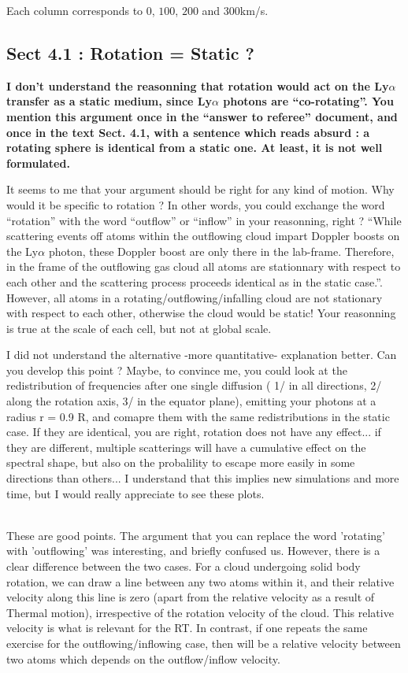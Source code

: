 \documentclass[12pt]{article}
\begin{document}
Each column corresponds to $0$, $100$, $200$ and $300$km/s.


\subsection*{Sect 4.1 : Rotation = Static ?}

{\bf I don’t understand the reasonning that rotation would act on the
  Ly$\alpha$ transfer as a static medium, since Ly$\alpha$ photons are
  “co-rotating”. You mention this argument once in the “answer to
  referee” document, and once in the text Sect. 4.1, with a sentence
  which reads absurd : a rotating sphere is identical from a static
  one. At least, it is not well formulated.

It seems to me that your argument should be right for any kind of
motion. Why would it be specific to rotation ? In other words, you
could exchange the word “rotation” with the word “outflow” or “inflow”
in your reasonning, right ? “While scattering events off atoms within
the outflowing cloud impart Doppler boosts on the Ly$\alpha$ photon,
these Doppler boost are only there in the lab-frame. Therefore, in the
frame of the outflowing gas cloud all atoms are stationnary with
respect to each other and the scattering process proceeds identical as
in the static case.”. However, all atoms in a
rotating/outflowing/infalling cloud are not stationary with respect to
each other, otherwise the cloud would be static! Your reasonning is
true at the scale of each cell, but not at global scale. 

I did not understand the alternative -more quantitative- explanation better.
Can you develop this point ? Maybe, to convince me, you could look at
the redistribution of frequencies after one single diffusion ( 1/ in
all directions, 2/ along the rotation axis, 3/ in the equator plane),
emitting your photons at a radius r = 0.9 R, and comapre them with the
same redistributions in the static case. If they are identical, you
are right, rotation does not have any effect... if they are different,
multiple scatterings will have a cumulative effect on the spectral
shape, but also on the probalility to escape more easily in some
directions than others... I understand that this implies new
simulations and more time, but I would really appreciate to see these
plots. } \\ 

These are good points. The argument that you can replace the word
'rotating' with 'outflowing' was interesting, and briefly confused
us. However, there is a clear difference between the two cases. For a
cloud undergoing solid body rotation, we can draw a line between any
two atoms within it, and their relative velocity along this line is
zero (apart from the relative velocity as a result of Thermal motion),
irrespective of the rotation velocity of the cloud. This relative
velocity is what is relevant for the RT. In contrast, if one repeats
the same exercise for the outflowing/inflowing case, then will be a
relative velocity between two atoms which depends on the
outflow/inflow velocity.\\ 
\end{document}
